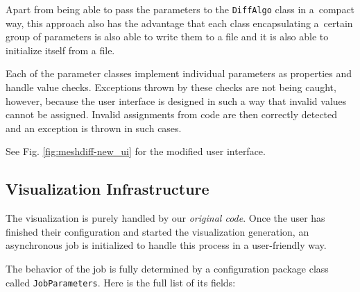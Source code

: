Apart from being able to pass the parameters to the \verb+DiffAlgo+ class in a~compact way, this approach also has the advantage that each class encapsulating a~certain group of parameters is also able to write them to a file and it is also able to initialize itself from a file\footnotemark.


Each of the parameter classes implement individual parameters as properties and handle value checks. Exceptions thrown by these checks are not being caught, however, because the user interface is designed in such a way that invalid values cannot be assigned. Invalid assignments from code are then correctly detected and an exception is thrown in such cases.

See Fig. \ref{fig:meshdiff-new_ui} for the modified user interface.
\subsection{Visualization Infrastructure}
\label{subsec:implementation-architecture-infrastructure}

The visualization is purely handled by our {\it original code}. Once the user has finished their configuration and started the visualization generation, an asynchronous job is initialized to handle this process in a user-friendly way.

The behavior of the job is fully determined by a configuration package class called \verb+JobParameters+. Here is the full list of its fields:

